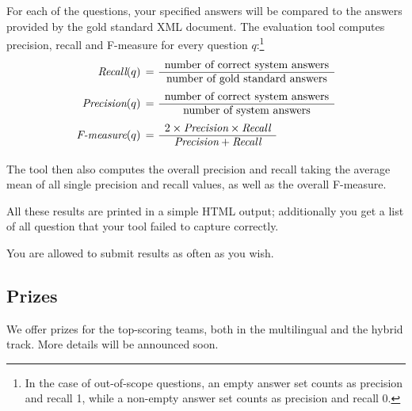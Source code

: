 For each of the questions, your specified answers will be compared to the answers provided by the gold standard XML document. 
The evaluation tool computes precision, recall and F-measure for every question $q$:\footnote{In the case of out-of-scope 
questions, an empty answer set counts as precision and recall 1, while a non-empty answer set counts as 
precision and recall 0.}
\begin{align*}
\text{\em Recall}(q) &\, =\, \begin{array}{c} 
                  \text{number of correct system answers} \\
                  \hline 
                  \text{number of gold standard answers} \\ 
                  \end{array} \\
\text{\em Precision}(q) &\, =\, \begin{array}{c} 
                  \text{number of correct system answers} \\
                  \hline 
                  \text{number of system answers} \\ 
                  \end{array} \\
\text{\em F-measure}(q) &\, =\, \begin{array}{c}
                      2\times \text{\em Precision}\times \text{\em Recall} \\
                      \hline 
                      \text{\em Precision} + \text{\em Recall} \\
                      \end{array} \\
\end{align*}

\vspace*{-.7cm}

The tool then also computes the overall precision and recall taking the average mean of
all single precision and recall values, as well as the overall F-measure.

All these results are printed in a simple HTML output; additionally you get a list of 
all question that your tool failed to capture correctly.

You are allowed to submit results as often as you wish.


\subsection{Prizes}

We offer prizes for the top-scoring teams, both in the multilingual and the hybrid track. More details will be announced soon. 
